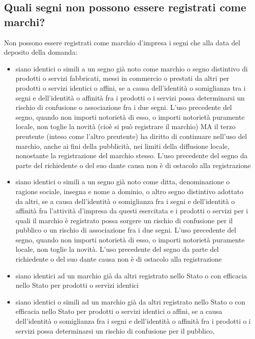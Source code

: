 \subsection{Quali segni non possono essere registrati come marchi?}
Non possono essere registrati come marchio d'impresa i segni che alla data del deposito della domanda:
\begin{itemize}
    \item siano identici o simili a un segno già noto come marchio o segno distintivo di prodotti o servizi
    fabbricati, messi in commercio o prestati da altri per prodotti o servizi identici o affini, se a causa dell'identità o somiglianza tra i segni
    e dell'identità o affinità fra i prodotti o i servizi possa determinarsi un rischio di confusione o associazione fra i due segni.\newline
    L'uso precedente del segno, quando non importi notorietà di esso, o importi notorietà puramente locale, non toglie la novità (cioè si può registrare il marchio)
    MA il terzo preutente (inteso come l'altro preutente) ha diritto di continuare nell'uso del marchio, anche ai fini della pubblicità, nei limiti
    della diffusione locale, nonostante la registrazione del marchio stesso. L'uso precedente del segno da parte
    del richiedente o del suo dante causa non è di ostacolo alla registrazione
    \item siano identici o simili a un segno già noto come ditta, denominazione o ragione sociale, insegna e nome a dominio, o altro segno distintivo adottato
    da altri, se a causa dell'identità o somiglianza fra i segni e dell'identità o affinità fra l'attività d'impresa da questi esercitata e i prodotti o servizi per i quali
    il marchio è registrato possa sorgere un rischio di confusione per il pubblico o un rischio di associazione fra i due segni.\newline
    L'uso precedente del segno, quando non importi notorietà di esso, o importi notorietà puramente locale, non toglie la novità. L'uso precedente del segno da parte del richiedente
    o del suo dante causa non è di ostacolo alla registrazione
    \item siano identici ad un marchio già da altri registrato nello Stato o con efficacia nello Stato per prodotti o servizi identici
    \item siano identici o simili ad un marchio già da altri registrato nello Stato o con efficacia nello Stato per prodotti o servizi identici
    o affini, se a causa dell'identità o somiglianza fra i segni e dell'identità o affinità fra i prodotti o i servizi possa determinarsi un rischio di confusione per il pubblico,

\end{itemize}
